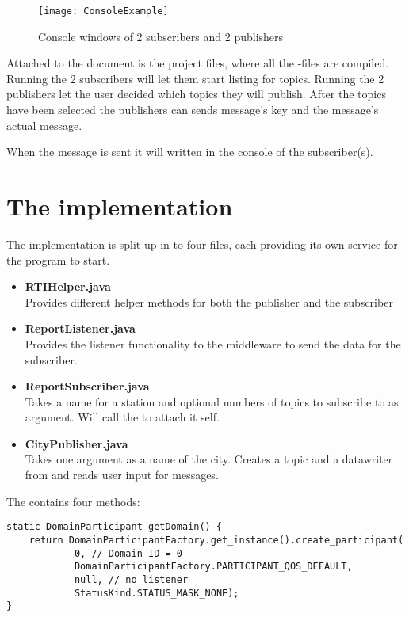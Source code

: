 \documentclass[Main]{subfiles}
\begin{document}
\begin{figure}[hbtp]
\centering
\texttt{[image: ConsoleExample]}
\caption{Console windows of 2 subscribers and 2 publishers}
\label{Fig:example}
\end{figure}


Attached to the document is the project files, where all the -files are compiled.
Running the 2 subscribers will let them start listing for topics.
Running the 2 publishers let the user decided which topics they will publish.
After the topics have been selected the publishers can sends message's key and the message's actual message.

When the message is sent it will written in the console of the subscriber(s).




\section{The implementation}

The implementation is split up in to four files, each providing its own service for the program to start.

	\begin{itemize}
	\item \textbf{RTIHelper.java}
	\\
	Provides different helper methods for both the publisher and the subscriber

	\item \textbf{ReportListener.java}
	\\
	Provides the listener functionality to the middleware to send the data for the subscriber.
	
	\item \textbf{ReportSubscriber.java}
	\\
	Takes a name for a station and optional numbers of topics to subscribe to as argument. Will call the  to attach it self.
	
	\item \textbf{CityPublisher.java}
	\\
	Takes one argument as a name of the city. 
	Creates a topic and a datawriter from  and reads user input for messages.
	
	\end{itemize}

The  contains four methods:

\begin{lstlisting}[caption=RTIHelper: getDomain(), style=Code-Java, label=lst:getDomain]
static DomainParticipant getDomain() {
	return DomainParticipantFactory.get_instance().create_participant(
			0, // Domain ID = 0
			DomainParticipantFactory.PARTICIPANT_QOS_DEFAULT, 
			null, // no listener
			StatusKind.STATUS_MASK_NONE);
}
\end{lstlisting}
\end{document}
